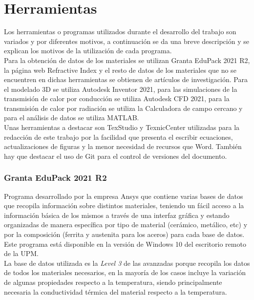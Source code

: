 \section{Herramientas}

Los herramientas o programas utilizados durante el desarrollo del trabajo son variados y por diferentes motivos, a continuación se da una breve descripción y se explican los motivos de la utilización de cada programa.\\

Para la obtención de datos de los materiales se utilizan Granta EduPack 2021 R2, la página web Refractive Index y el resto de datos de los materiales que no se encuentren en dichas herramientas se obtienen de artículos de investigación. Para el modelado 3D se utiliza Autodesk Inventor 2021, para las simulaciones de la transmisión de calor por conducción se utiliza Autodesk CFD 2021, para la transmisión de calor por radiación se utiliza la Calculadora de campo cercano y para el análisis de datos se utiliza MATLAB.\\

Unas herramientas a destacar son TexStudio y TexnicCenter utilizadas para la redacción de este trabajo por la facilidad que presenta el escribir ecuaciones, actualizaciones de figuras y la menor necesidad de recursos que Word. También hay que destacar el uso de Git para el control de versiones del documento.\\
\subsubsection{Granta EduPack 2021 R2}
Programa desarrollado por la empresa Ansys que contiene varias bases de datos que recopila información sobre distintos materiales, teniendo un fácil acceso a la información básica de los mismos a través de una interfaz gráfica y estando organizadas de manera específica por tipo de material (cerámico, metálico, etc) y por la composición (ferrita y austenita para los aceros) para cada base de datos. Este programa está disponible en la versión de Windows 10 del escritorio remoto de la UPM.\\

La base de datos utilizada es la \textit{Level 3} de las avanzadas porque recopila los datos de todos los materiales necesarios, en la mayoría de los casos incluye la variación de algunas propiedades respecto a la temperatura, siendo principalmente necesaria la conductividad térmica del material respecto a la temperatura.

